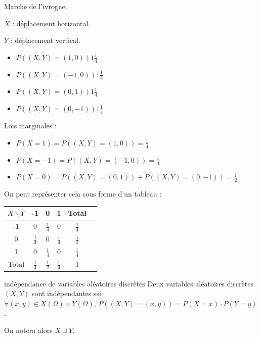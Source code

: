 \begin{exemple}
    Marche de l'ivrogne. 

    $X$ : déplacement horizontal.

    $Y$ : déplacement vertical.


    \svspace 
    
    \begin{itemize}
        \item $P((X, Y) = (1, 0)) 1 \frac 1 4$
        \item $P((X, Y) = (-1, 0)) 1 \frac 1 4$
        \item $P((X, Y) = (0, 1)) 1 \frac 1 4$
        \item $P((X, Y) = (0, -1)) 1 \frac 1 4$
    \end{itemize}

    Lois marginales : 
    \begin{itemize}
        \item $P(X = 1) = P((X, Y) = (1, 0)) = \frac 1 4$
        \item $P(X = -1) = P((X, Y) = (-1, 0)) = \frac 1 4$
        \item $P(X = 0) = P((X, Y) = (0, 1)) + P((X, Y) = (0, -1)) = \frac 1 2$
    \end{itemize}

    On peut représenter cela sous forme d'un tableau : 
    \begin{center}
        \begin{tabular}{c|c|c|c|c|c}
            $X \backslash Y$ & -1 & 0 & 1 & Total \\
            \hline
            -1 & 0 & $\frac 1 4$ & 0 & $\frac 1 4$ \\
            \hline
            0 & $\frac 1 4$ & 0 & $\frac 1 4$ & $\frac 1 2$ \\
            \hline
            1 & 0 & $\frac 1 4$ & 0 & $\frac 1 4$ \\
            \hline
            Total & $\frac 1 4$ & $\frac 1 2$ & $\frac 1 4$ & 1 
        \end{tabular}
    \end{center}


\end{exemple}

\begin{definition}{indépendance de variables aléatoires discrètes}{}
    Deux variables aléatoires discrètes $(X, Y)$ sont indépendantes ssi 
    $\forall (x, y) \in X(\Omega) \times Y(\Omega), \, P((X, Y) = (x, y)) = P(X = x) \cdot P(Y = y)$.

    On notera alors $X \sqcup Y$.
\end{definition}

